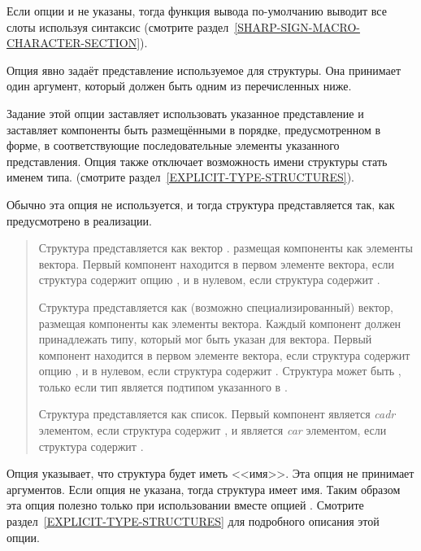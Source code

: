 \begin{flushdesc}
Если опции  и  не указаны, тогда функция вывода
по-умолчанию выводит все слоты используя синтаксис  (смотрите
раздел~\ref{SHARP-SIGN-MACRO-CHARACTER-SECTION}).

\item[\cd{:type}]
Опция  явно задаёт представление используемое для структуры. Она
принимает один аргумент, который должен быть одним из перечисленных ниже.

Задание этой опции заставляет использовать указанное представление и
заставляет компоненты быть размещёнными в порядке, предусмотренном
в  форме,
в соответствующие последовательные элементы указанного представления.
Опция также отключает возможность имени структуры стать именем типа.
(смотрите раздел~\ref{EXPLICIT-TYPE-STRUCTURES}).

Обычно эта опция не используется, и тогда структура представляется так, как
предусмотрено в реализации.

\begin{quotation}    %
\begin{flushdesc}

\item[\cdf{vector}]
Структура представляется как вектор . размещая
компоненты как элементы вектора. Первый компонент находится в первом
элементе вектора, если структура содержит опцию , и в нулевом, если
структура содержит .

\item[\cd{(vector \emph{element-type})}]
Структура представляется как (возможно специализированный) вектор, размещая
компоненты как элементы вектора. Каждый компонент должен принадлежать типу,
который мог быть указан для вектора. Первый компонент находится в первом
элементе вектора, если структура содержит опцию , и в нулевом, если
структура содержит .
Структура может быть , только если тип  является подтипом
указанного в .

\item[\cdf{list}]
Структура представляется как список.
Первый компонент является \emph{cadr} элементом, если структура содержит , и
является \emph{car} элементом, если структура содержит .
\end{flushdesc}
\end{quotation}

\item[\cd{:named}]
Опция  указывает, что структура будет иметь <<имя>>. Эта опция не
принимает аргументов. Если опция  не указана, тогда структура имеет
имя. Таким образом эта опция полезно только при использовании вместе опцией
.
Смотрите раздел~\ref{EXPLICIT-TYPE-STRUCTURES} для подробного описания этой
опции.


\end{flushdesc}
